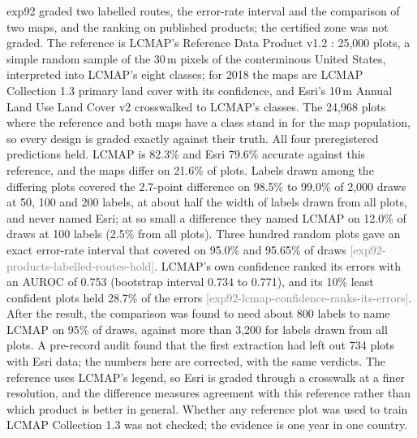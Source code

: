 \documentclass[11pt,a4paper]{article}
\newcommand{\claim}[1]{{\scriptsize\textsf{\textcolor{gray}{[#1]}}}}
\begin{document}
exp92 graded two labelled routes, the error-rate interval and the comparison of two maps, and the ranking on published
products; the certified zone was not graded. The reference is LCMAP's Reference Data Product v1.2
\citep{pengra2020}: 25,000 plots, a simple random sample of the 30\,m pixels of the conterminous United States,
interpreted into LCMAP's eight classes; for 2018 the maps are LCMAP Collection 1.3 primary land cover with its
confidence, and Esri's 10\,m Annual Land Use Land Cover v2 crosswalked to LCMAP's classes. The 24,968 plots where the
reference and both maps have a class stand in for the map population, so every design is graded exactly against
their truth. All four preregistered predictions held. LCMAP is 82.3\% and Esri 79.6\% accurate against this reference,
and the maps differ on 21.6\% of plots. Labels drawn among the differing plots covered the 2.7-point difference on
98.5\% to 99.0\% of 2,000 draws at 50, 100 and 200 labels, at about half the width of labels drawn from all plots, and
never named Esri; at so small a difference they named LCMAP on 12.0\% of draws at 100 labels (2.5\% from all plots).
Three hundred random plots gave an exact error-rate interval that covered on 95.0\% and 95.65\% of draws
\claim{exp92-products-labelled-routes-hold}. LCMAP's own confidence ranked its errors with an AUROC of 0.753 (bootstrap
interval 0.734 to 0.771), and its 10\% least confident plots held 28.7\% of the errors
\claim{exp92-lcmap-confidence-ranks-its-errors}. After the result, the comparison was found to need about 800 labels to
name LCMAP on 95\% of draws, against more than 3,200 for labels drawn from all plots. A pre-record audit found that
the first extraction had left out 734 plots with Esri data; the numbers here are corrected, with the same verdicts.
The reference uses LCMAP's legend, so Esri is graded through a crosswalk at a finer resolution, and the difference
measures agreement with this reference rather than which product is better in general. Whether any reference plot
was used to train LCMAP Collection 1.3 was not checked; the evidence is one year in one country.
\end{document}
